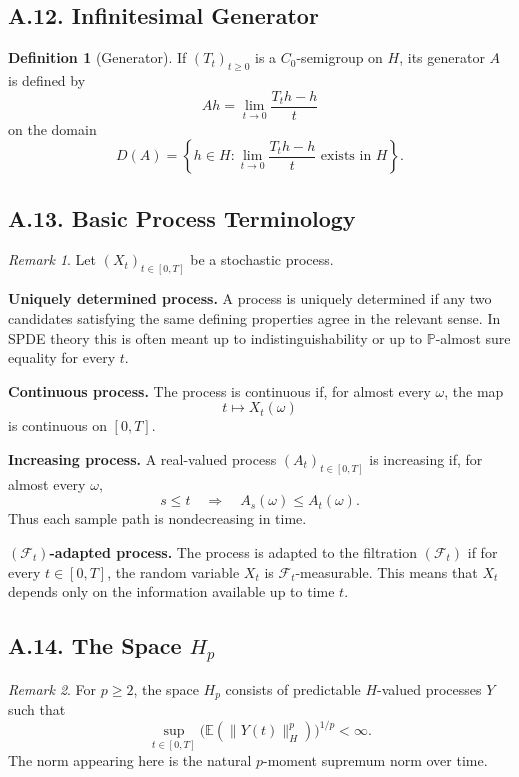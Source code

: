 \documentclass[11pt]{article}
\theoremstyle{definition}
\newtheorem{definition}{Definition}
\theoremstyle{remark}
\newtheorem{remark}{Remark}
\begin{document}
\subsection*{A.12. Infinitesimal Generator}
\begin{definition}[Generator]
If \((T_t)_{t\ge 0}\) is a \(C_0\)-semigroup on \(H\), its generator \(A\) is defined by
\[
Ah=\lim_{t\to 0}\frac{T_th-h}{t}
\]
on the domain
\[
D(A)=\left\{h\in H:\lim_{t\to 0}\frac{T_th-h}{t}\text{ exists in }H\right\}.
\]
\end{definition}

\subsection*{A.13. Basic Process Terminology}
\begin{remark}
Let \((X_t)_{t\in[0,T]}\) be a stochastic process.

\textbf{Uniquely determined process.} A process is uniquely determined if any two candidates satisfying the same defining properties agree in the relevant sense. In SPDE theory this is often meant up to indistinguishability or up to \(\mathbb P\)-almost sure equality for every \(t\).

\textbf{Continuous process.} The process is continuous if, for almost every \(\omega\), the map
\[
t\mapsto X_t(\omega)
\]
is continuous on \([0,T]\).

\textbf{Increasing process.} A real-valued process \((A_t)_{t\in[0,T]}\) is increasing if, for almost every \(\omega\),
\[
s\le t \quad \Longrightarrow \quad A_s(\omega)\le A_t(\omega).
\]
Thus each sample path is nondecreasing in time.

\textbf{\((\mathcal F_t)\)-adapted process.} The process is adapted to the filtration \((\mathcal F_t)\) if for every \(t\in[0,T]\), the random variable \(X_t\) is \(\mathcal F_t\)-measurable. This means that \(X_t\) depends only on the information available up to time \(t\).
\end{remark}

\subsection*{A.14. The Space \(H_p\)}
\begin{remark}
For \(p\ge 2\), the space \(H_p\) consists of predictable \(H\)-valued processes \(Y\) such that
\[
\sup_{t\in[0,T]}\bigl(\mathbb E(\|Y(t)\|_H^p)\bigr)^{1/p}<\infty.
\]
The norm appearing here is the natural \(p\)-moment supremum norm over time.
\end{remark}
\end{document}
